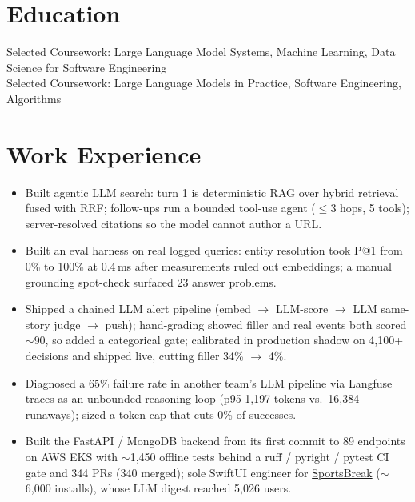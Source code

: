\documentclass[11pt, letterpaper]{article}
\begin{document}

\section{Education}
Selected Coursework: Large Language Model Systems, Machine Learning, Data Science for Software Engineering\\[1pt]
Selected Coursework: Large Language Models in Practice, Software Engineering, Algorithms

\section{Work Experience}
\begin{itemize}
  \item Built agentic LLM search: turn 1 is deterministic RAG over hybrid retrieval fused with RRF; follow-ups run a bounded tool-use agent ($\le$3 hops, 5 tools); server-resolved citations so the model cannot author a URL.
  \item Built an eval harness on real logged queries: entity resolution took P@1 from 0\% to 100\% at 0.4\,ms after measurements ruled out embeddings; a manual grounding spot-check surfaced 23 answer problems.
  \item Shipped a chained LLM alert pipeline (embed $\to$ LLM-score $\to$ LLM same-story judge $\to$ push); hand-grading showed filler and real events both scored $\sim$90, so added a categorical gate; calibrated in production shadow on 4{,}100+ decisions and shipped live, cutting filler 34\% $\to$ 4\%.
  \item Diagnosed a 65\% failure rate in another team's LLM pipeline via Langfuse traces as an unbounded reasoning loop (p95 1{,}197 tokens vs.\ 16{,}384 runaways); sized a token cap that cuts 0\% of successes.
  \item Built the FastAPI / MongoDB backend from its first commit to 89 endpoints on AWS EKS with $\sim$1{,}450 offline tests behind a ruff / pyright / pytest CI gate and 344 PRs (340 merged); sole SwiftUI engineer for \href{https://apps.apple.com/app/id6762649287}{SportsBreak} ($\sim$6{,}000 installs), whose LLM digest reached 5{,}026 users.
\end{itemize}
\end{document}
